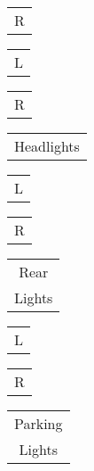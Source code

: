 \documentclass{book}
\begin{document}
\mpxshipout%
{\small \renewcommand{\arraystretch}{.9}
                \circuitfont\begin{tabular}[t]{@{}r@{}}
                   R
	        \end{tabular}}%
\stopmpxshipout
\mpxshipout%
{\small \renewcommand{\arraystretch}{.9}
                \circuitfont\begin{tabular}[t]{@{}r@{}}
                   L
	        \end{tabular}}%
\stopmpxshipout
\mpxshipout%
{\small \renewcommand{\arraystretch}{.9}
                \circuitfont\begin{tabular}[t]{@{}r@{}}
                   R
	        \end{tabular}}%
\stopmpxshipout
\mpxshipout%
{\small \renewcommand{\arraystretch}{.9}
                \circuitfont\begin{tabular}[t]{@{}c@{}}
                   Headlights
	        \end{tabular}}%
\stopmpxshipout
\mpxshipout%
{\small \renewcommand{\arraystretch}{.9}
                \circuitfont\begin{tabular}[t]{@{}r@{}}
                   L
	        \end{tabular}}%
\stopmpxshipout
\mpxshipout%
{\small \renewcommand{\arraystretch}{.9}
                \circuitfont\begin{tabular}[t]{@{}r@{}}
                   R
	        \end{tabular}}%
\stopmpxshipout
\mpxshipout%
{\small \renewcommand{\arraystretch}{.9}
                \circuitfont\begin{tabular}[t]{@{}c@{}}
                   Rear \\ Lights
	        \end{tabular}}%
\stopmpxshipout
\mpxshipout%
{\small \renewcommand{\arraystretch}{.9}
                \circuitfont\begin{tabular}[t]{@{}r@{}}
                   L
	        \end{tabular}}%
\stopmpxshipout
\mpxshipout%
{\small \renewcommand{\arraystretch}{.9}
                \circuitfont\begin{tabular}[t]{@{}r@{}}
                   R
	        \end{tabular}}%
\stopmpxshipout
\mpxshipout%
{\small \renewcommand{\arraystretch}{.9}
                \circuitfont\begin{tabular}[t]{@{}c@{}}
                   Parking \\ Lights
	        \end{tabular}}%
\end{document}
